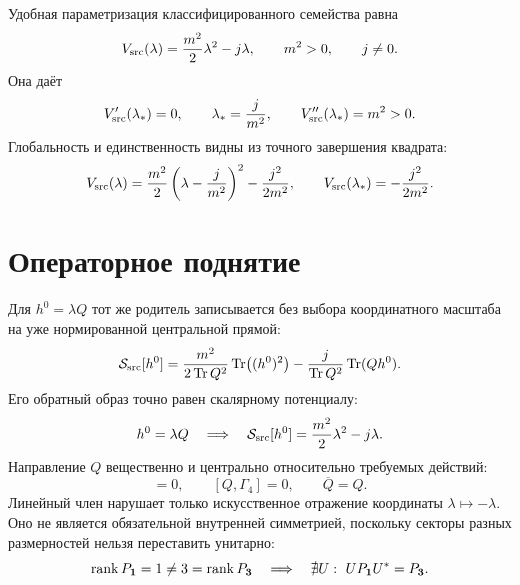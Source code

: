 Удобная параметризация классифицированного семейства равна
\begin{equation}
 V_{\rm src}(\lambda)=\frac{m^2}{2}\lambda^2-j\lambda,
 \qquad m^2>0,
 \qquad j\ne0.
 \label{eq:v8-baryon-c0-central-gap-source-parent}
\end{equation}
Она даёт
\begin{equation}
 V'_{\rm src}(\lambda_*)=0,
 \qquad \lambda_*=\frac{j}{m^2},
 \qquad V''_{\rm src}(\lambda_*)=m^2>0.
 \label{eq:v8-baryon-c0-central-gap-source-vacuum-hessian}
\end{equation}
Глобальность и единственность видны из точного завершения квадрата:
\begin{equation}
 V_{\rm src}(\lambda)
 =\frac{m^2}{2}\left(\lambda-\frac{j}{m^2}\right)^2
 -\frac{j^2}{2m^2},
 \qquad V_{\rm src}(\lambda_*)=-\frac{j^2}{2m^2}.
 \label{eq:v8-baryon-c0-central-gap-source-completed-square}
\end{equation}

\section{Операторное поднятие}

Для $h^0=\lambda Q$ тот же родитель записывается без выбора координатного
масштаба на уже нормированной центральной прямой:
\begin{equation}
 \mathcal S_{\rm src}[h^0]
 =\frac{m^2}{2\operatorname{Tr} Q^2}\operatorname{Tr}\bigl((h^0)^2\bigr)
 -\frac{j}{\operatorname{Tr} Q^2}\operatorname{Tr}(Qh^0).
 \label{eq:v8-baryon-c0-central-gap-operator-source-parent}
\end{equation}
Его обратный образ точно равен скалярному потенциалу:
\begin{equation}
 h^0=\lambda Q
 \quad\Longrightarrow\quad
 \mathcal S_{\rm src}[h^0]
 =\frac{m^2}{2}\lambda^2-j\lambda.
 \label{eq:v8-baryon-c0-central-gap-operator-pullback}
\end{equation}
Направление $Q$ вещественно и центрально относительно требуемых действий:
\begin{equation}
 [Q,\rho_{\mathbf1\oplus\mathbf3}(SO(3)_{\rm fam})]=0,
 \qquad [Q,\Gamma_4]=0,
 \qquad \overline Q=Q.
 \label{eq:v8-baryon-c0-central-gap-source-symmetry-compatibility}
\end{equation}
Линейный член нарушает только искусственное отражение координаты
$\lambda\mapsto-\lambda$. Оно не является обязательной внутренней
симметрией, поскольку секторы разных размерностей нельзя переставить
унитарно:
\begin{equation}
 \operatorname{rank} P_{\mathbf1}=1\ne3=\operatorname{rank} P_{\mathbf3}
 \quad\Longrightarrow\quad
 \nexists U:\ UP_{\mathbf1}U^*=P_{\mathbf3}.
 \label{eq:v8-baryon-c0-central-gap-no-required-sign-symmetry}
\end{equation}

